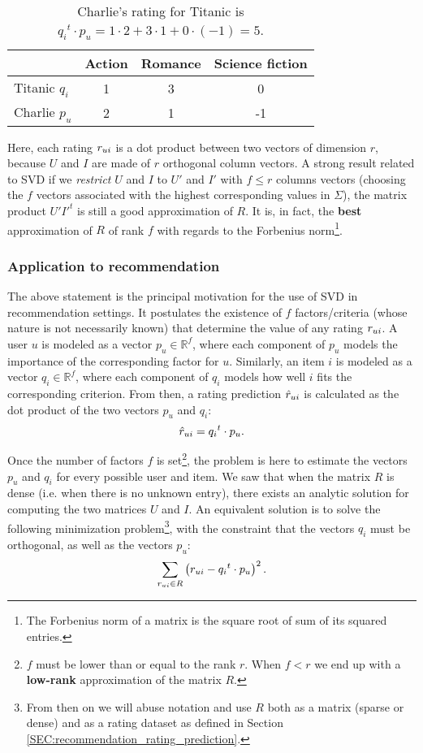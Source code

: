 \begin{table}[h!] \centering \begin{tabular}{ l   c  c  c }
\toprule
    & Action & Romance & Science fiction\\
  \midrule
    Titanic $q_i$ & 1 & 3 & 0\\
    Charlie $p_u$ & 2 & 1 & -1\\
\bottomrule
\end{tabular}
  \caption{Charlie's rating for Titanic is ${q_i}^t \cdot p_u = 1 \cdot 2 + 3
  \cdot 1 + 0 \cdot (-1) = 5$.}
\label{TAB:Charlie_Titanic}
\end{table}

Here, each rating $r_{ui}$ is a dot product between two vectors of dimension $r$,
because $U$ and $I$ are made of $r$ orthogonal column vectors. A strong result
related to SVD if we \textit{restrict} $U$ and $I$ to $U'$ and $I'$ with $f \leq
r$ columns vectors (choosing the $f$ vectors associated with the highest
corresponding values in $\Sigma$), the matrix product $U' {I'}^t$ is still a
good approximation of $R$. It is, in fact, the \textbf{best} approximation of
$R$ of rank $f$ with regards to the Forbenius norm\footnote{The Forbenius norm
of a matrix is the square root of sum of its squared entries.}.

\subsubsection{Application to recommendation}

The above statement is the principal motivation for the use of SVD in recommendation
settings. It postulates the existence of $f$ factors/criteria (whose nature is
not necessarily known) that determine the value of any rating $r_{ui}$.  A user
$u$ is modeled as a vector $p_u \in \mathbb{R}^f$, where each component of
$p_u$ models the importance of the corresponding factor for $u$.  Similarly, an
item $i$ is modeled as a vector $q_i \in \mathbb{R}^f$, where each component of
$q_i$ models how well $i$ fits the corresponding criterion.  From then, a rating
prediction $\hat{r}_{ui}$ is calculated as the dot product of the two vectors $p_u$
and $q_i$:
$$\hat{r}_{ui} = {q_i}^t \cdot p_u.$$

Once the number of factors $f$ is set\footnote{$f$ must be lower than or equal
to the rank $r$. When $f < r$ we end up with a \textbf{low-rank} approximation
of the matrix $R$.}, the problem is here to estimate the
vectors $p_u$ and $q_i$ for every possible user and item. We saw that when the
matrix $R$ is dense (i.e. when  there is no unknown entry), there exists an analytic
solution for computing the two matrices $U$ and $I$. An equivalent solution is
to solve the following minimization problem\footnote{From then on we will abuse
notation and use $R$ both as a matrix (sparse or dense) and as a rating
dataset as defined in Section \ref{SEC:recommendation_rating_prediction}.},
with the constraint that the vectors $q_i$ must be orthogonal, as well as the
vectors $p_u$:
$$
\sum_{r_{ui} \in R} \left(r_{ui} - {q_i}^t \cdot p_u \right)^2.
$$

